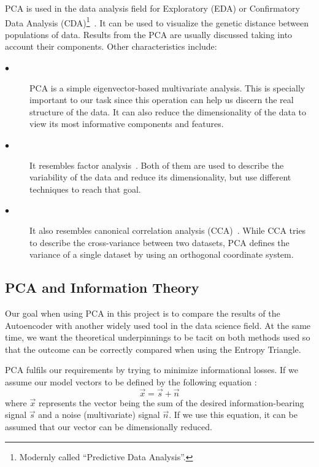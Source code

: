 PCA is used in the data analysis field for Exploratory (EDA) or Confirmatory Data Analysis (CDA)\footnote{Modernly called ``Predictive Data Analysis''.}~\cite{tuk:80}. It can be used to visualize the genetic distance between populations of data. Results from the PCA are usually discussed taking into account their components. Other characteristics include:

\begin{description}
	
	\item[$\bullet$] PCA is a simple eigenvector-based multivariate analysis. This is specially important to our task since this operation can help us discern the real structure of the data. It can also reduce the dimensionality of the data to view its most informative components and features.
	
	\item[$\bullet$] It resembles factor analysis~\cite{PCA_and_factor_analysis}. Both of them are used to describe the variability of the data and reduce its dimensionality, but use different techniques to reach that goal.
	
	\item[$\bullet$] It also resembles canonical correlation analysis (CCA)~\cite{PCA_and_CCA}. While CCA tries to describe the cross-variance between two datasets, PCA defines the variance of a single dataset by using an orthogonal coordinate system.
	
\end{description}

\subsection{PCA and Information Theory}

Our goal when using PCA in this project is to compare the results of the Autoencoder with another widely used tool in the data science field. At the same time, we want the theoretical underpinnings to be tacit on both methods used so that the outcome can be correctly compared when using the Entropy Triangle.\par

PCA fulfils our requirements by trying to minimize  informational losses. If we assume our model vectors to be defined by the  following equation :
%
\begin{equation}\label{eq:pca_equation}
\vec x = \vec s + \vec n 
\end{equation}
\noindent
where $\vec x$ represents the vector being the sum of the desired information-bearing signal $\vec s$ and a noise (multivariate) signal $\vec n$. If we use this equation, it can be assumed that our vector can be dimensionally reduced.\par

